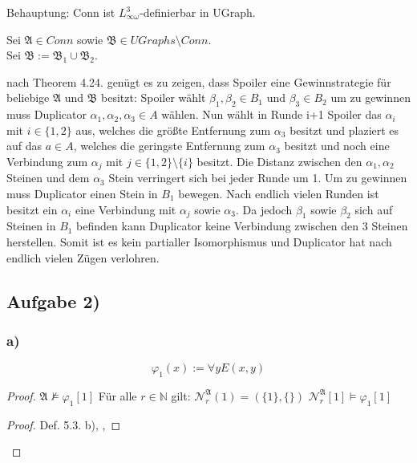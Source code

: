 \documentclass[12pt]{article}
\begin{document}
Behauptung: Conn ist $L^3_{\infty \omega}$-definierbar in UGraph.

Sei $\mathfrak{A} \in Conn$ sowie $\mathfrak{B}\in UGraphs \setminus Conn$.\\
Sei $\mathfrak{B}:=\mathfrak{B}_1\cup \mathfrak{B}_2$.

nach Theorem 4.24. genügt es zu zeigen, dass Spoiler eine Gewinnstrategie für 
beliebige $\mathfrak{A}$ und $\mathfrak{B}$ besitzt: Spoiler wählt $\beta_1, \beta_2
\in B_1$ und $\beta_3\in B_2$ um zu gewinnen muss Duplicator 
$\alpha_1,\alpha_2,\alpha_3 \in A$ wählen. Nun wählt in Runde i+1 Spoiler das 
$\alpha_i$ mit $i\in \{1,2\}$ aus, welches die größte Entfernung zum $\alpha_3$ besitzt und plaziert es
auf das $a\in A$, welches die geringste Entfernung zum $\alpha_3$ besitzt und
noch eine Verbindung zum $\alpha_j$ mit $j\in \{1,2\}\setminus \{i\}$ besitzt. 
Die Distanz zwischen den $\alpha_1,\alpha_2$ Steinen und dem $\alpha_3$ Stein verringert 
sich bei jeder Runde um 1.
Um zu gewinnen muss Duplicator einen Stein in $B_1$ bewegen. Nach endlich vielen
Runden ist besitzt ein $\alpha_i$ eine Verbindung mit $\alpha_j$ sowie $\alpha_3$.
Da jedoch $\beta_1$ sowie $\beta_2$ sich auf Steinen in $B_1$ befinden kann Duplicator
keine Verbindung zwischen den 3 Steinen herstellen. Somit ist es kein partialler Isomorphismus und Duplicator hat nach endlich vielen Zügen verlohren.


\subsection*{Aufgabe 2)}

\subsubsection*{a)}

\[ \varphi_1(x) := \forall y E(x,y) \] 

\begin{proof}
   {  }
   {  }
   {  }
   { $\mathfrak{A}\nvDash \varphi_1[1]$ }
   { Für alle $r\in \mathbb{N}$ gilt: $\mathcal{N}_r^\mathfrak{A} (1) = (\{1\},\{\})$ }
   { $\mathcal{N}_r^\mathfrak{A}[1] \models \varphi_1[1]$ }
  \qedstep 
  \begin{proof}
    \pf Def. 5.3. b), , 
  \end{proof}
\end{proof}
\end{document}
